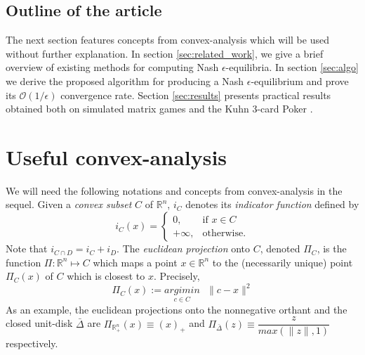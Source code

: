 \documentclass[12pt]{article}
\begin{document}
\subsection{Outline of the article}
The next section features concepts from convex-analysis which will be used without further explanation. In section \ref{sec:related_work}, we give a brief overview of existing methods for computing Nash $\epsilon$-equilibria. In section \ref{sec:algo} we derive the proposed algorithm for producing a Nash $\epsilon$-equilibrium and prove its $\mathcal{O}(1/\epsilon)$ convergence rate. Section \ref{sec:results} presents practical results obtained both on simulated matrix games and the Kuhn 3-card Poker \cite{kuhn}.

\section{Useful convex-analysis}
\label{sec:notation}
We will need the following notations and concepts from convex-analysis in the sequel.
Given a \textit{convex subset} $C$ of $\mathbb{R}^n$, $i_C$ denotes its \textit{indicator function} defined by
\begin{equation}
  i_C(x) = \begin{cases}
    0, &\mbox{if } x \in C\\
    +\infty, &\mbox{otherwise}.
    \end{cases}
  \end{equation}
Note that $i_{C \cap D} = i_C + i_D$. The \textit{euclidean projection} onto $C$, denoted $\Pi_C$, is the function
$\Pi: \mathbb{R}^n \mapsto C$ which maps a point $x \in \mathbb{R}^n$ to the (necessarily unique) point $\Pi_C(x)$ of $C$ which is closest to $x$. Precisely,
\begin{equation}
  \Pi_C(x) := \underset{c \in C}{argimin}\text{ }\|c - x\|^2
\end{equation}
As an example, the euclidean projections onto the nonnegative orthant and the closed unit-disk $\bar{\Delta}$
are $\Pi_{\mathbb{R}^n_+}(x) \equiv (x)_+$ and $\Pi_{\bar{\Delta}}(z) \equiv \dfrac{z}{max(\|z\|, 1)}$ respectively.
\end{document}
